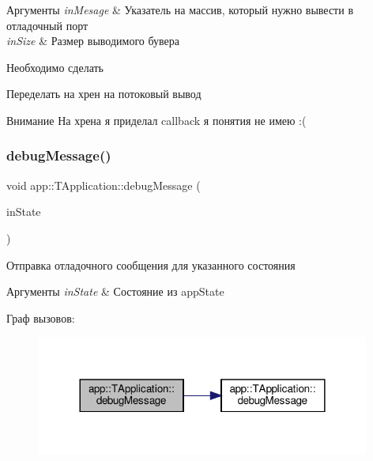  
\begin{DoxyParams}{Аргументы}
{\em in\+Mesage} & Указатель на массив, который нужно вывести в отладочный порт \\
\hline
{\em in\+Size} & Размер выводимого бувера \\
\hline
\end{DoxyParams}
\begin{DoxyRefDesc}{Необходимо сделать}
\item[\hyperlink{todo__todo000002}{Необходимо сделать}]Переделать на хрен на потоковый вывод \end{DoxyRefDesc}
\begin{DoxyAttention}{Внимание}
На хрена я приделал callback я понятия не имею \+:( 
\end{DoxyAttention}
\mbox{\label{classapp_1_1_t_application_ade46529292a73f5184abb54b135c4a2e}} 
\subsubsection{\texorpdfstring{debug\+Message()}{debugMessage()}\hspace{0.1cm}{\footnotesize\ttfamily [4/4]}}
{\footnotesize\ttfamily void app\+::\+T\+Application\+::debug\+Message (\begin{DoxyParamCaption}\item[{const \hyperlink{group___xD0_x9F_xD0_xB5_xD1_x80_xD0_xB5_xD1_x87_xD0_xB8_xD1_x81_xD0_xBB_xD0_xB5_xD0_xBD_xD0_xB8_xD1_x8F_ga290e8080c661e52c2f685fd4af148acf}{app\+State}}]{in\+State }\end{DoxyParamCaption})}



Отправка отладочного сообщения для указанного состояния 


\begin{DoxyParams}{Аргументы}
{\em in\+State} & Состояние из app\+State \\
\hline
\end{DoxyParams}
Граф вызовов\+:\nopagebreak
\begin{figure}[H]
\begin{center}
\leavevmode
\includegraphics[width=312pt]{classapp_1_1_t_application_ade46529292a73f5184abb54b135c4a2e_cgraph}
\end{center}
\end{figure}
\mbox{\label{classapp_1_1_t_application_aa2cb4a923a937f1a47a28fb5efe3b943}} 
